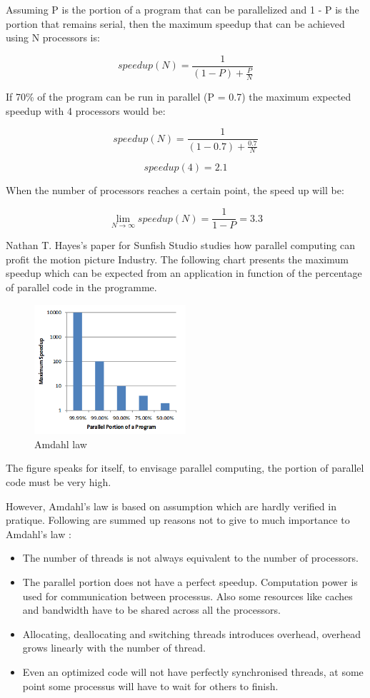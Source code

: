Assuming P is the portion of a program that can be parallelized and 1 - P  is
the portion that remains serial, then the maximum speedup that can be achieved
using N processors is: 

$$speedup(N) = \frac{1}{(1-P) + \frac{P}{N}} $$

If 70\% of the program can be run in parallel (P = 0.7) the maximum expected
speedup with 4 processors would be:

$$speedup(N) = \frac{1}{(1-0.7) + \frac{0.7}{N}}$$

$$speedup(4) = 2.1$$

When the number of processors reaches a certain point, the speed up will be:


$$\lim\limits_{N \to \infty} speedup(N)= \frac{1}{1-P} = 3.3$$


Nathan T. Hayes's paper for Sunfish Studio \citep{Reference8} studies how
parallel computing can profit the motion picture Industry. The following chart
presents the maximum speedup which can be expected from an application in
function of the percentage of parallel code in the programme.

\begin{figure}[H] 
  \centering
  \includegraphics[width=0.5\textwidth]{./Figures/amdahl.png}
  \caption[Amdahl law]{Amdahl law \citep{Reference8}} 
  \label{fig:amdahl} 
\end{figure}

The figure speaks for itself, to envisage parallel computing, the portion of
parallel code must be very high.

However, Amdahl's law is based on assumption which are hardly verified in
pratique. Following are summed up reasons not to give to much importance to
Amdahl's law \citep{Reference34}:

\begin{itemize} 
  \item The number of threads is not always equivalent to the number of processors.  
  \item The parallel portion does not have a perfect speedup. Computation power is used
    for communication between processus. Also some resources like caches and bandwidth
    have to be shared across all the processors.  
  \item Allocating, deallocating and switching threads introduces overhead, overhead grows
    linearly with the number of thread.  
  \item Even an optimized code will not have perfectly synchronised threads, at some point
    some processus will have to wait for others to finish.	
\end{itemize}



